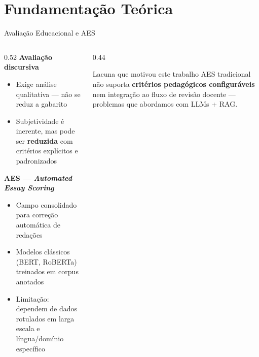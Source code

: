 \documentclass[10pt,aspectratio=169]{beamer}
\begin{document}
\section{Fundamentação Teórica}

\begin{frame}{Avaliação Educacional e AES}
  \begin{columns}[T]
    \begin{column}{0.52\textwidth}
      \textbf{Avaliação discursiva}
      \begin{itemize}
        \item Exige análise qualitativa — não se reduz a gabarito
        \item Subjetividade é inerente, mas pode ser \textbf{reduzida} com critérios explícitos e padronizados
      \end{itemize}
      \vspace{0.5em}
      \textbf{AES --- \textit{Automated Essay Scoring}}
      \begin{itemize}
        \item Campo consolidado para correção automática de redações
        \item Modelos clássicos (BERT, RoBERTa) treinados em corpus anotados
        \item Limitação: dependem de dados rotulados em larga escala e língua/domínio específico
      \end{itemize}
    \end{column}
    \begin{column}{0.44\textwidth}
      \begin{block}{Lacuna que motivou este trabalho}
        AES tradicional não suporta \textbf{critérios pedagógicos configuráveis} nem integração ao fluxo de revisão docente — problemas que abordamos com LLMs + RAG.
      \end{block}
    \end{column}
  \end{columns}
\end{frame}
\end{document}
